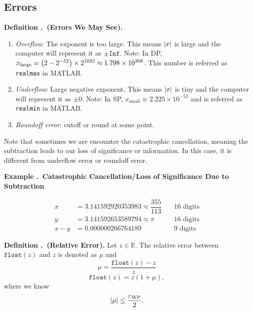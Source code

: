 \documentclass[12pt, a4paper]{article}
\newcounter{index}[subsection]
\newenvironment*{df}[1]{\par\noindent\textbf{Definition \thesubsection.\stepcounter{index}\theindex\ (#1).}}{\par}
\newenvironment*{eg}[1]{\begin{framed}\par\noindent\textbf{Example \thesubsection.\stepcounter{index}\theindex\ #1} \par}{\par\end{framed}}
\def\R{{\mathbb{R}}}
\def\float{\texttt{float}}
\def\Inf{\texttt{Inf}}
\def\epsilon{\varepsilon}
\begin{document}
\subsection{Errors}
\begin{df}{Errors We May See}
	\begin{enumerate}
		\item \textit{Overflow}: The exponent is too large. This means $\qty|x|$ is large and the computer will represent it as $\pm\Inf.$ Note: In DP, $x_\text{large}=\qty(2-2^{-52})\times2^{1023}\approx1.798\times10^{308}$. This number is referred as \texttt{realmax} in MATLAB.
		\item \textit{Underflow}: Large negative exponent. This means $\qty|x|$ is tiny and the computer will represent it as $\pm0$. Note: In SP, $x_\text{small}\approx2.225\times10^{-53}$ and is referred as \texttt{realmin} in MATLAB.
		\item \textit{Roundoff error}: cutoff or round at some point. 
	\end{enumerate}	
	Note that sometimes we are encounter the catastrophic cancellation, meaning the subtraction leads to our loss of significance or information. In this case, it is different from underflow error or roundoff error.
\end{df}
\begin{eg}{Catastrophic Cancellation/Loss of Significance Due to Subtraction}
	\[\begin{aligned}x&=3.141592920353983\approx\dfrac{355}{113}&\quad16\text{ digits}\\y&=3.141592653589794\approx\pi&\quad16\text{ digits}\\x-y&=0.000000266764189&\quad9\text{ digits}\end{aligned}\]
\end{eg}
\begin{df}{Relative Error}
	Let $z\in\R$. The relative error between $\float(z)$ and $z$ is denoted as $\mu$ and \[\mu=\dfrac{\float(z)-z}{z}\]\[\float(z)=z(1+\mu),\] where we know \[\qty|\mu|\leq\dfrac{\epsilon_\text{WP}}{2}.\]
\end{df}
\end{document}
